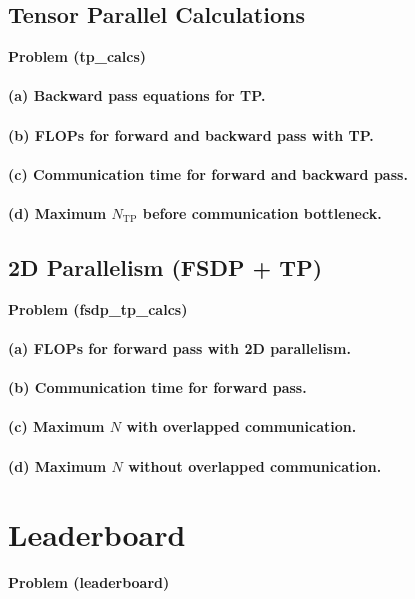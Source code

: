 \documentclass[11pt]{article}
\begin{document}
\subsection{Tensor Parallel Calculations}
\textbf{Problem (tp\_calcs)}

\paragraph{(a) Backward pass equations for TP.}


\paragraph{(b) FLOPs for forward and backward pass with TP.}


\paragraph{(c) Communication time for forward and backward pass.}


\paragraph{(d) Maximum $N_{\text{TP}}$ before communication bottleneck.}


\subsection{2D Parallelism (FSDP + TP)}
\textbf{Problem (fsdp\_tp\_calcs)}

\paragraph{(a) FLOPs for forward pass with 2D parallelism.}


\paragraph{(b) Communication time for forward pass.}


\paragraph{(c) Maximum $N$ with overlapped communication.}


\paragraph{(d) Maximum $N$ without overlapped communication.}



\section{Leaderboard}

\textbf{Problem (leaderboard)}

\end{document}

